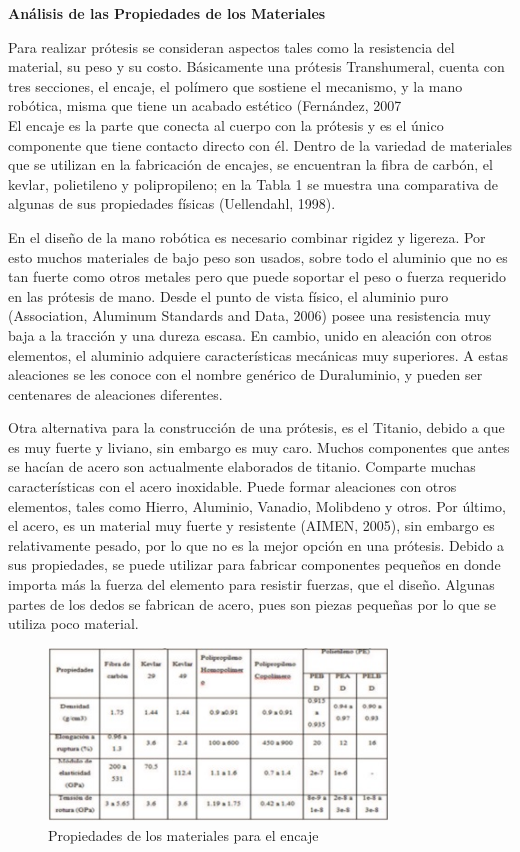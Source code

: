\documentclass{article}
\begin{document}
{\textbf{Análisis de las Propiedades de los Materiales}}

Para realizar prótesis se consideran aspectos tales como la resistencia del material, su peso y su costo. Básicamente una prótesis Transhumeral, cuenta con tres secciones, el encaje, el polímero que sostiene el mecanismo, y la mano robótica, misma que tiene un acabado estético (Fernández, 2007\\
El encaje es la parte que conecta al cuerpo con la prótesis y es el único componente que tiene contacto directo con él. Dentro de la variedad de materiales que se utilizan en la fabricación de encajes, se encuentran la fibra de carbón, el kevlar, polietileno y polipropileno; en la Tabla 1 se muestra una comparativa de algunas de sus propiedades físicas (Uellendahl, 1998). 


\item En el diseño de la mano robótica es necesario combinar rigidez y ligereza. Por esto muchos materiales de bajo peso son usados, sobre todo el aluminio que no es tan fuerte como otros metales pero que puede soportar el peso o fuerza requerido en las prótesis de mano. Desde el punto de vista físico, el aluminio puro (Association, Aluminum Standards and Data, 2006) posee una resistencia muy baja a la tracción y una dureza escasa. En cambio, unido en aleación con otros elementos, el aluminio adquiere características mecánicas muy superiores. A estas aleaciones se les conoce con el nombre genérico de Duraluminio, y pueden ser centenares de aleaciones diferentes. 

\item Otra alternativa para la construcción de una prótesis, es el Titanio, debido a que es muy fuerte y liviano, sin embargo es muy caro. Muchos componentes que antes se hacían de acero son actualmente elaborados de titanio. Comparte muchas características con el acero inoxidable. Puede formar aleaciones con otros elementos, tales como Hierro, Aluminio, Vanadio, Molibdeno y otros. Por último, el acero, es un material muy fuerte y resistente (AIMEN, 2005), sin embargo es relativamente pesado, por lo que no es la mejor opción en una prótesis. Debido a sus propiedades, se puede utilizar para fabricar componentes pequeños en donde importa más la fuerza del elemento para resistir fuerzas, que el diseño. Algunas partes de los dedos se fabrican de acero, pues son piezas pequeñas por lo que se utiliza poco material.

\begin{figure} %
    \centering
    \includegraphics[width=90mm]{propiedades.jpg} %
    \caption{Propiedades de los materiales para el encaje}
    \label{grafica}
\end{figure}
\end{document}
